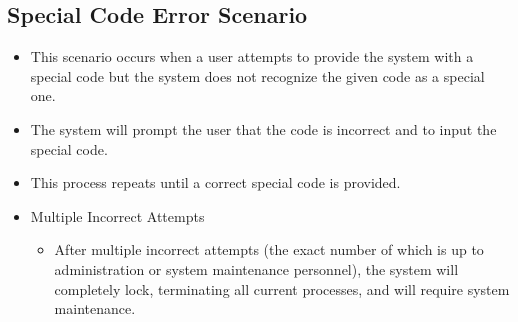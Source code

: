 \subsection{Special Code Error Scenario}
\begin{itemize}
    \item This scenario occurs when a user attempts to provide the system with 
    a special code but the system does not recognize the given code as a 
    special one.
    \item The system will prompt the user that the code is incorrect and to 
    input the special code.
    \item This process repeats until a correct special code is provided.
    \item Multiple Incorrect Attempts
    \begin{itemize}
        \item After multiple incorrect attempts (the exact number of which is 
        up to administration or system maintenance personnel), the system will 
        completely lock, terminating all current processes, and will require 
        system maintenance.
    \end{itemize}
\end{itemize}

